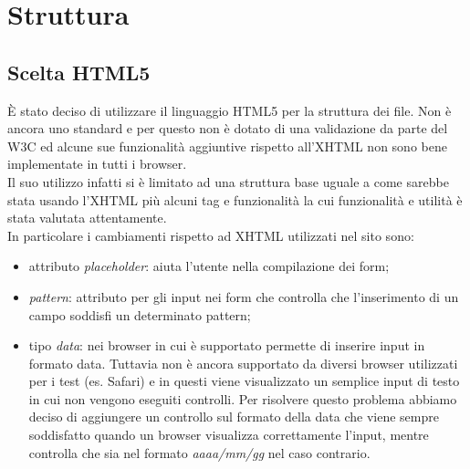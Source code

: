 \section{Struttura}
	\subsection{Scelta HTML5}
	È stato deciso di utilizzare il linguaggio HTML5 per la struttura dei file. Non è ancora uno standard e per questo non è dotato di una validazione da parte del W3C ed alcune sue funzionalità aggiuntive rispetto all'XHTML non sono bene implementate in tutti i browser.\\
	Il suo utilizzo infatti si è limitato ad una struttura base uguale a come sarebbe stata usando l'XHTML più alcuni tag e funzionalità la cui funzionalità e utilità è stata valutata attentamente. \\In particolare i cambiamenti rispetto ad XHTML utilizzati nel sito sono:
	\begin{itemize}
		\item attributo \emph{placeholder}: aiuta l'utente nella compilazione dei form;
		\item \emph{pattern}: attributo per gli input nei form che controlla che l'inserimento di un campo soddisfi un determinato pattern;
		\item tipo \emph{data}: nei browser in cui è supportato permette di inserire input in formato data. Tuttavia non è ancora supportato da diversi browser utilizzati per i test (es. Safari) e in questi viene visualizzato un semplice input di testo in cui non vengono eseguiti controlli. Per risolvere questo problema abbiamo deciso di aggiungere un controllo sul formato della data che viene sempre soddisfatto quando un browser visualizza correttamente l'input, mentre controlla che sia nel formato \emph{aaaa/mm/gg} nel caso contrario.
	\end{itemize}	

		


